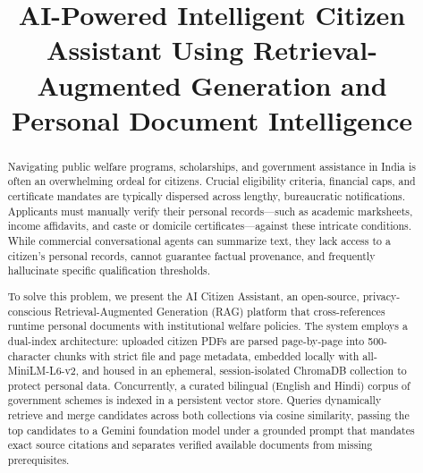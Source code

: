 \documentclass[conference]{IEEEtran}
\begin{document}
\title{AI-Powered Intelligent Citizen Assistant Using Retrieval-Augmented Generation and Personal Document Intelligence}

\author{
}

\maketitle

\begin{abstract}
Navigating public welfare programs, scholarships, and government assistance in India is often an overwhelming ordeal for citizens. Crucial eligibility criteria, financial caps, and certificate mandates are typically dispersed across lengthy, bureaucratic notifications. Applicants must manually verify their personal records---such as academic marksheets, income affidavits, and caste or domicile certificates---against these intricate conditions. While commercial conversational agents can summarize text, they lack access to a citizen's personal records, cannot guarantee factual provenance, and frequently hallucinate specific qualification thresholds. 

To solve this problem, we present the AI Citizen Assistant, an open-source, privacy-conscious Retrieval-Augmented Generation (RAG) platform that cross-references runtime personal documents with institutional welfare policies. The system employs a dual-index architecture: uploaded citizen PDFs are parsed page-by-page into 500-character chunks with strict file and page metadata, embedded locally with all-MiniLM-L6-v2, and housed in an ephemeral, session-isolated ChromaDB collection to protect personal data. Concurrently, a curated bilingual (English and Hindi) corpus of government schemes is indexed in a persistent vector store. Queries dynamically retrieve and merge candidates across both collections via cosine similarity, passing the top candidates to a Gemini foundation model under a grounded prompt that mandates exact source citations and separates verified available documents from missing prerequisites. 


\end{abstract}
\end{document}
